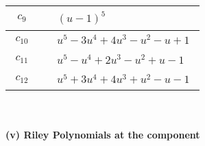 \documentclass[1p]{elsarticle_modified}
\theoremstyle{definition}
\begin{document}
\begin{tabular}{m{50pt}|m{274pt}}
\hline $$\begin{aligned}c_{9}\end{aligned}$$&$\begin{aligned}
&(u-1)^5
\end{aligned}$\\
\hline $$\begin{aligned}c_{10}\end{aligned}$$&$\begin{aligned}
&u^5-3 u^4+4 u^3- u^2- u+1
\end{aligned}$\\
\hline $$\begin{aligned}c_{11}\end{aligned}$$&$\begin{aligned}
&u^5- u^4+2 u^3- u^2+u-1
\end{aligned}$\\
\hline $$\begin{aligned}c_{12}\end{aligned}$$&$\begin{aligned}
&u^5+3 u^4+4 u^3+u^2- u-1
\end{aligned}$\\
\hline
\end{tabular}\\~\\
\newpage\renewcommand{\arraystretch}{1}
\flushleft \textbf{(v) Riley Polynomials at the component}\newline \\
\end{document}
